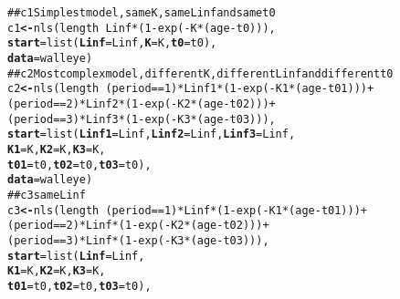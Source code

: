 \documentclass[12pt,oneside,a4paper]{article}\usepackage[]{graphicx}\usepackage[]{xcolor}
\makeatletter
\newcommand{\hlnum}[1]{\textcolor[rgb]{0,0,0}{#1}}%
\newcommand{\hlcom}[1]{\textcolor[rgb]{0.443,0.478,0.702}{#1}}%
\newcommand{\hlopt}[1]{\textcolor[rgb]{0,0,0}{#1}}%
\newcommand{\hlstd}[1]{\textcolor[rgb]{0,0,0}{#1}}%
\newcommand{\hlkwb}[1]{\textcolor[rgb]{0.498,0,0.333}{\textbf{#1}}}%
\newcommand{\hlkwc}[1]{\textcolor[rgb]{0.498,0,0.333}{\textbf{#1}}}%
\newcommand{\hlkwd}[1]{\textcolor[rgb]{0,0,0}{#1}}%
\newenvironment{kframe}{%
 \def\at@end@of@kframe{}%
 \ifinner\ifhmode%
  \def\at@end@of@kframe{\end{minipage}}%
  \begin{minipage}{\columnwidth}%
 \fi\fi%
 \def\FrameCommand##1{\hskip\@totalleftmargin \hskip-\fboxsep
 \colorbox{shadecolor}{##1}\hskip-\fboxsep
     \hskip-\linewidth \hskip-\@totalleftmargin \hskip\columnwidth}%
 \MakeFramed {\advance\hsize-\width
   \@totalleftmargin\z@ \linewidth\hsize
   \@setminipage}}%
 {\par\unskip\endMakeFramed%
 \at@end@of@kframe}
\newenvironment{knitrout}{}{} %
\makeatother
\begin{document}
\begin{knitrout}
\begin{kframe}
\begin{alltt}
\hlcom{## c1 Simplest model, same K, same Linf and same t0}
\hlstd{c1} \hlkwb{<-} \hlkwd{nls}\hlstd{(length} \hlopt{~} \hlstd{Linf} \hlopt{*} \hlstd{(}\hlnum{1} \hlopt{-} \hlkwd{exp}\hlstd{(} \hlopt{-} \hlstd{K} \hlopt{*} \hlstd{(age} \hlopt{-} \hlstd{t0))),}
          \hlkwc{start} \hlstd{=} \hlkwd{list}\hlstd{(}\hlkwc{Linf} \hlstd{= Linf,} \hlkwc{K} \hlstd{= K,} \hlkwc{t0} \hlstd{= t0),}
          \hlkwc{data} \hlstd{= walleye)}
\hlcom{## c2 Most complex model, different K, different Linf and different t0}
\hlstd{c2} \hlkwb{<-} \hlkwd{nls}\hlstd{(length} \hlopt{~} \hlstd{(period} \hlopt{==} \hlnum{1}\hlstd{)} \hlopt{*} \hlstd{Linf1} \hlopt{*} \hlstd{(}\hlnum{1} \hlopt{-} \hlkwd{exp}\hlstd{(} \hlopt{-} \hlstd{K1} \hlopt{*} \hlstd{(age} \hlopt{-} \hlstd{t01)))} \hlopt{+}
                   \hlstd{(period} \hlopt{==} \hlnum{2}\hlstd{)} \hlopt{*} \hlstd{Linf2} \hlopt{*} \hlstd{(}\hlnum{1} \hlopt{-} \hlkwd{exp}\hlstd{(} \hlopt{-} \hlstd{K2} \hlopt{*} \hlstd{(age} \hlopt{-} \hlstd{t02)))} \hlopt{+}
                   \hlstd{(period} \hlopt{==} \hlnum{3}\hlstd{)} \hlopt{*} \hlstd{Linf3} \hlopt{*} \hlstd{(}\hlnum{1} \hlopt{-} \hlkwd{exp}\hlstd{(} \hlopt{-} \hlstd{K3} \hlopt{*} \hlstd{(age} \hlopt{-} \hlstd{t03))),}
          \hlkwc{start} \hlstd{=} \hlkwd{list}\hlstd{(}\hlkwc{Linf1} \hlstd{= Linf,} \hlkwc{Linf2} \hlstd{= Linf,} \hlkwc{Linf3} \hlstd{= Linf,}
                       \hlkwc{K1} \hlstd{= K,} \hlkwc{K2} \hlstd{= K,} \hlkwc{K3} \hlstd{= K,}
                       \hlkwc{t01} \hlstd{= t0,} \hlkwc{t02} \hlstd{= t0,} \hlkwc{t03} \hlstd{= t0),}
          \hlkwc{data} \hlstd{= walleye)}
\hlcom{## c3 same Linf}
\hlstd{c3} \hlkwb{<-} \hlkwd{nls}\hlstd{(length} \hlopt{~} \hlstd{(period} \hlopt{==} \hlnum{1}\hlstd{)} \hlopt{*} \hlstd{Linf} \hlopt{*} \hlstd{(}\hlnum{1} \hlopt{-} \hlkwd{exp}\hlstd{(} \hlopt{-} \hlstd{K1} \hlopt{*} \hlstd{(age} \hlopt{-} \hlstd{t01)))} \hlopt{+}
                   \hlstd{(period} \hlopt{==} \hlnum{2}\hlstd{)} \hlopt{*} \hlstd{Linf} \hlopt{*} \hlstd{(}\hlnum{1} \hlopt{-} \hlkwd{exp}\hlstd{(} \hlopt{-} \hlstd{K2} \hlopt{*} \hlstd{(age} \hlopt{-} \hlstd{t02)))} \hlopt{+}
                   \hlstd{(period} \hlopt{==} \hlnum{3}\hlstd{)} \hlopt{*} \hlstd{Linf} \hlopt{*} \hlstd{(}\hlnum{1} \hlopt{-} \hlkwd{exp}\hlstd{(} \hlopt{-} \hlstd{K3} \hlopt{*} \hlstd{(age} \hlopt{-} \hlstd{t03))),}
          \hlkwc{start} \hlstd{=} \hlkwd{list}\hlstd{(}\hlkwc{Linf} \hlstd{= Linf,}
                       \hlkwc{K1} \hlstd{= K,} \hlkwc{K2} \hlstd{= K,} \hlkwc{K3} \hlstd{= K,}
                       \hlkwc{t01} \hlstd{= t0,} \hlkwc{t02} \hlstd{= t0,} \hlkwc{t03} \hlstd{= t0),}

\end{alltt}
\end{kframe}
\end{knitrout}
\end{document}
